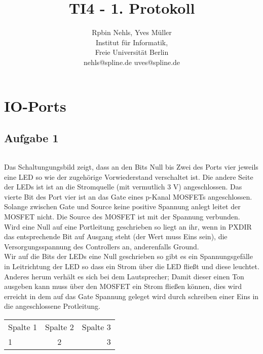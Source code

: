 \documentclass[11pt,a4paper,onecolumn]{report}
\title{TI4 - 1. Protokoll}
\author{Rpbin Nehls, Yves M\"uller\\
  Institut f\"ur Informatik,\\
  Freie Universit\"at Berlin\\
  nehls@spline.de uves@spline.de }
\date{}
\begin{document}
\maketitle
\tableofcontents

\part{IO-Ports}

\chapter{Aufgabe 1}

\paragraph*{}
Das Schaltungungsbild zeigt, dass an den Bits Null bis Zwei des Ports vier 
jeweils eine LED so wie der zugehörige Vorwiederstand verschaltet ist. 
Die andere Seite der LEDs ist ist an die Stromquelle (mit vermutlich 3 V) 
angeschlossen. Das vierte Bit des Port vier ist an das Gate eines p-Kanal 
MOSFETs angeschlossen. Solange zwischen Gate und Source keine positive
Spannung anlegt leitet der MOSFET nicht. Die Source des MOSFET ist mit 
der Spannung verbunden. \\
Wird eine Null auf eine Portleitung geschrieben so liegt an ihr, wenn in
PXDIR das entsprechende Bit auf Ausgang steht (der Wert muss Eins sein), 
die Versorgungsspannung des Controllers an, anderenfalls Ground. \\
Wir auf die Bits der LEDs eine Null geschrieben so gibt es ein 
Spannungsgefälle in Leitrichtung der LED so dass ein Strom über die LED 
fließt und diese leuchtet. Anderes herum verhält es sich bei dem 
Lautsprecher; Damit dieser einen Ton ausgeben kann muss über den MOSFET
ein Strom fließen können, dies wird erreicht in dem auf das Gate Spannung 
geleget wird durch schreiben einer Eins in die angeschlossene Protleitung.

 \begin{tabular}{lcr}
  Spalte 1 & Spalte 2 & Spalte 3 \\
  1 & 2 & 3 \\
 \end{tabular}
\end{document}
